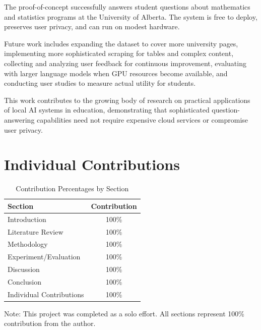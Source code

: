 \documentclass[conference]{IEEEtran}
\begin{document}
The proof-of-concept successfully answers student questions about mathematics and statistics programs at the University of Alberta. The system is free to deploy, preserves user privacy, and can run on modest hardware.

Future work includes expanding the dataset to cover more university pages, implementing more sophisticated scraping for tables and complex content, collecting and analyzing user feedback for continuous improvement, evaluating with larger language models when GPU resources become available, and conducting user studies to measure actual utility for students.

This work contributes to the growing body of research on practical applications of local AI systems in education, demonstrating that sophisticated question-answering capabilities need not require expensive cloud services or compromise user privacy.

\section{Individual Contributions}
\label{sec:contributions}

\begin{table}[h]
\centering
\caption{Contribution Percentages by Section}
\label{tab:contributions}
\begin{tabular}{|l|c|}
\hline
\textbf{Section} & \textbf{Contribution} \\
\hline
Introduction & 100\% \\
\hline
Literature Review & 100\% \\
\hline
Methodology & 100\% \\
\hline
Experiment/Evaluation & 100\% \\
\hline
Discussion & 100\% \\
\hline
Conclusion & 100\% \\
\hline
Individual Contributions & 100\% \\
\hline
\end{tabular}
\end{table}

Note: This project was completed as a solo effort. All sections represent 100\% contribution from the author.

\end{document}
